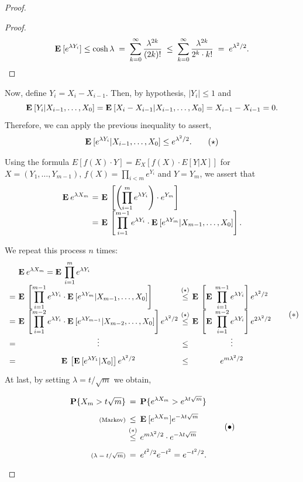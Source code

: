 \begin{proof}
\begin{proof}
    \[
        \mathbf{E}\:[e^{\lambda Y_i}]\leq \cosh \lambda \;=\; \sum_{k = 0}^\infty \frac{\lambda^{2k}}{(2k)!} \;\leq\; \sum_{k = 0}^\infty \frac{\lambda^{2k}}{2^k \cdot k!} \;=\; e^{\lambda^2 / 2}.
    \]

    \end{proof}

    Now, define $Y_i = X_i - X_{i-1}$. Then, by hypothesis, $|Y_i| \leq 1$ and
    \[ \mathbf{E}\: [Y_i | X_{i-1},\ldots, X_0] = \mathbf{E}\: [X_i - X_{i-1} | X_{i-1},\ldots, X_0] = X_{i-1} - X_{i-1} = 0. \] 
    Therefore, we can apply the previous inequality to assert,
    \[ \mathbf{E}\: [e^{\lambda Y_i} | X_{i-1},\ldots, X_0] \leq e^{\lambda^2/2}. \tag*{$ (\star) $}\]

    Using the formula $E[f(X)\cdot Y] = E_X [f(X)\cdot E[Y|X]]$ for $X = (Y_1, \ldots, Y_{m-1})$, $f(X) = \prod_{i<m} e^{Y_i}$ and $Y = Y_m$, we assert that
    \[ \everymath{\displaystyle}\arraycolsep=1.8pt\def\arraystretch{1.8}
    \begin{array}{rcl}
        \E e^{\lambda X_m} & = & \E \left[ \left(\prod_{i = 1}^{m} e^{\lambda Y_i}\right)\cdot e^{Y_m} \right]\\
        & = &  \E\left[\prod_{i = 1}^{m-1} e^{\lambda Y_i} \cdot \E[e^{\lambda Y_m} | X_{m-1},\ldots, X_0]\right].
    \end{array}
     \]

    We repeat this process $n$ times:
    \[ \everymath{\displaystyle}\arraycolsep=1.8pt\def\arraystretch{1.8}
        \begin{array}{r c c c l}
        & & \E e^{\lambda X_m}  =   \E \prod_{i = 1}^{m} e^{\lambda Y_i} \hfill\\
        & = & \E\left[\prod_{i = 1}^{m-1} e^{\lambda Y_i} \cdot \E[e^{\lambda Y_m} | X_{m-1},\ldots, X_0]\right] \hfill & \overset{(\star)}{\leq} & \E\left[\E \prod_{i = 1}^{m-1} e^{\lambda Y_i} \right] e^{\lambda^2 / 2}\\
        & = & \E\left[\prod_{i = 1}^{m-2} e^{\lambda Y_i} \cdot \E[e^{\lambda Y_{m-1}} | X_{m-2},\ldots, X_0]\right]e^{\lambda^2 / 2} & \overset{(\star)}{\leq} & \E\left[\E \prod_{i = 1}^{m-2} e^{\lambda Y_i} \right] e^{2\lambda^2 / 2}\\
        & = & \hfill\vdots\hfill & \leq & \hfill\vdots\hfill\\
        & = & \E\left[\E[e^{\lambda Y_{1}} |  X_0]\right]e^{\lambda^2 / 2} & \leq & \hfill e^{m\lambda^2/2} \hfill
    \end{array} \tag*{$ (*) $} \]
    At last, by setting $\lambda = t/\sqrt{m}$ we obtain,
    \[ \everymath{\displaystyle}\arraycolsep=1.8pt\def\arraystretch{1.8}
    \begin{array}{r c l}
        \P\{X_m > t\sqrt{m}\} & = & \P\{e^{\lambda X_m} > e^{\lambda t \sqrt{m}}\} \\
        \text{\scriptsize (Markov)}& \leq & \E[e^{\lambda X_m} ] e^{-\lambda t \sqrt{m}}\\
        & \overset{(*)}{\leq} & e^{m\lambda^2/2} \cdot e^{-\lambda t \sqrt{m}}\\
        \text{\scriptsize ($\lambda = t/\sqrt{m}$)} & = & e^{t^2/2} e^{-t^2} = e^{-t^2 / 2}.
    \end{array}    \tag*{$ (\bullet) $}
    \]
\end{proof}
